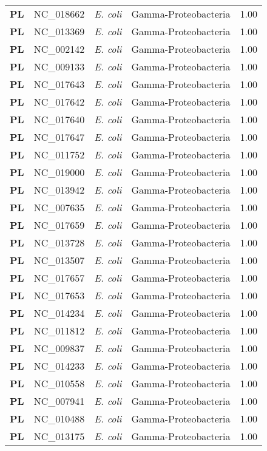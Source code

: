 \begin{adjustwidth}{-3cm}{2cm}
{\begin{supertabular}{>{\bfseries}l|p{0.1\textwidth}p{0.14\textwidth}l|l}
PL & NC\_018662 & \textit{E. coli} & Gamma-Proteobacteria & 1.00\\
PL & NC\_013369 & \textit{E. coli} & Gamma-Proteobacteria & 1.00\\
PL & NC\_002142 & \textit{E. coli} & Gamma-Proteobacteria & 1.00\\
PL & NC\_009133 & \textit{E. coli} & Gamma-Proteobacteria & 1.00\\
PL & NC\_017643 & \textit{E. coli} & Gamma-Proteobacteria & 1.00\\
PL & NC\_017642 & \textit{E. coli} & Gamma-Proteobacteria & 1.00\\
PL & NC\_017640 & \textit{E. coli} & Gamma-Proteobacteria & 1.00\\
PL & NC\_017647 & \textit{E. coli} & Gamma-Proteobacteria & 1.00\\
PL & NC\_011752 & \textit{E. coli} & Gamma-Proteobacteria & 1.00\\
PL & NC\_019000 & \textit{E. coli} & Gamma-Proteobacteria & 1.00\\
PL & NC\_013942 & \textit{E. coli} & Gamma-Proteobacteria & 1.00\\
PL & NC\_007635 & \textit{E. coli} & Gamma-Proteobacteria & 1.00\\
PL & NC\_017659 & \textit{E. coli} & Gamma-Proteobacteria & 1.00\\
PL & NC\_013728 & \textit{E. coli} & Gamma-Proteobacteria & 1.00\\
PL & NC\_013507 & \textit{E. coli} & Gamma-Proteobacteria & 1.00\\
PL & NC\_017657 & \textit{E. coli} & Gamma-Proteobacteria & 1.00\\
PL & NC\_017653 & \textit{E. coli} & Gamma-Proteobacteria & 1.00\\
PL & NC\_014234 & \textit{E. coli} & Gamma-Proteobacteria & 1.00\\
PL & NC\_011812 & \textit{E. coli} & Gamma-Proteobacteria & 1.00\\
PL & NC\_009837 & \textit{E. coli} & Gamma-Proteobacteria & 1.00\\
PL & NC\_014233 & \textit{E. coli} & Gamma-Proteobacteria & 1.00\\
PL & NC\_010558 & \textit{E. coli} & Gamma-Proteobacteria & 1.00\\
PL & NC\_007941 & \textit{E. coli} & Gamma-Proteobacteria & 1.00\\
PL & NC\_010488 & \textit{E. coli} & Gamma-Proteobacteria & 1.00\\
PL & NC\_013175 & \textit{E. coli} & Gamma-Proteobacteria & 1.00\\

\end{supertabular}}
\end{adjustwidth}
